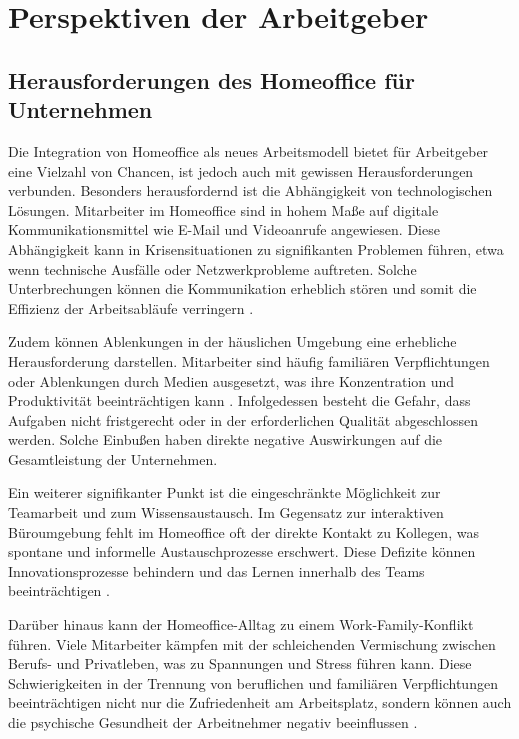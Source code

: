 \section{Perspektiven der Arbeitgeber}

\subsection{Herausforderungen des Homeoffice für Unternehmen}

Die Integration von Homeoffice als neues Arbeitsmodell bietet für Arbeitgeber eine Vielzahl von Chancen, ist jedoch auch mit gewissen Herausforderungen verbunden. Besonders herausfordernd ist die Abhängigkeit von technologischen Lösungen. Mitarbeiter im Homeoffice sind in hohem Maße auf digitale Kommunikationsmittel wie E-Mail und Videoanrufe angewiesen. Diese Abhängigkeit kann in Krisensituationen zu signifikanten Problemen führen, etwa wenn technische Ausfälle oder Netzwerkprobleme auftreten. Solche Unterbrechungen können die Kommunikation erheblich stören und somit die Effizienz der Arbeitsabläufe verringern \cite{file4}.

Zudem können Ablenkungen in der häuslichen Umgebung eine erhebliche Herausforderung darstellen. Mitarbeiter sind häufig familiären Verpflichtungen oder Ablenkungen durch Medien ausgesetzt, was ihre Konzentration und Produktivität beeinträchtigen kann \cite{file4}. Infolgedessen besteht die Gefahr, dass Aufgaben nicht fristgerecht oder in der erforderlichen Qualität abgeschlossen werden. Solche Einbußen haben direkte negative Auswirkungen auf die Gesamtleistung der Unternehmen.

Ein weiterer signifikanter Punkt ist die eingeschränkte Möglichkeit zur Teamarbeit und zum Wissensaustausch. Im Gegensatz zur interaktiven Büroumgebung fehlt im Homeoffice oft der direkte Kontakt zu Kollegen, was spontane und informelle Austauschprozesse erschwert. Diese Defizite können Innovationsprozesse behindern und das Lernen innerhalb des Teams beeinträchtigen \cite{file4}.

Darüber hinaus kann der Homeoffice-Alltag zu einem Work-Family-Konflikt führen. Viele Mitarbeiter kämpfen mit der schleichenden Vermischung zwischen Berufs- und Privatleben, was zu Spannungen und Stress führen kann. Diese Schwierigkeiten in der Trennung von beruflichen und familiären Verpflichtungen beeinträchtigen nicht nur die Zufriedenheit am Arbeitsplatz, sondern können auch die psychische Gesundheit der Arbeitnehmer negativ beeinflussen \cite{7}.

